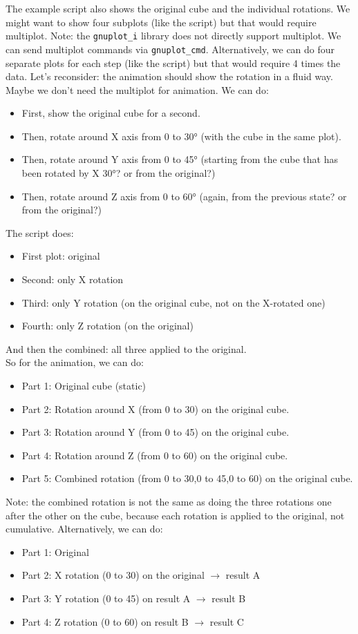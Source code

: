 \documentclass[a4paper,10pt]{article}
\begin{document}
The example script also shows the original cube and the individual rotations.
We might want to show four subplots (like the script) but that would require multiplot.
Note: the \verb|gnuplot_i| library does not directly support multiplot. We can send multiplot commands via \verb|gnuplot_cmd|.
Alternatively, we can do four separate plots for each step (like the script) but that would require 4 times the data.
Let's reconsider: the animation should show the rotation in a fluid way. Maybe we don't need the multiplot for animation.
We can do:
\begin{itemize}
\item First, show the original cube for a second.
\item Then, rotate around X axis from 0 to 30° (with the cube in the same plot).
\item Then, rotate around Y axis from 0 to 45° (starting from the cube that has been rotated by X 30°? or from the original?)
\item Then, rotate around Z axis from 0 to 60° (again, from the previous state? or from the original?)
\end{itemize}
The script does:
\begin{itemize}
\item First plot: original
\item Second: only X rotation
\item Third: only Y rotation (on the original cube, not on the X-rotated one)
\item Fourth: only Z rotation (on the original)
\end{itemize}
And then the combined: all three applied to the original.\\
So for the animation, we can do:
\begin{itemize}
\item Part 1: Original cube (static)
\item Part 2: Rotation around X (from 0 to 30) on the original cube.
\item Part 3: Rotation around Y (from 0 to 45) on the original cube.
\item Part 4: Rotation around Z (from 0 to 60) on the original cube.
\item Part 5: Combined rotation (from 0 to 30,0 to 45,0 to 60) on the original cube.
\end{itemize}
Note: the combined rotation is not the same as doing the three rotations one after the other on the cube, because each rotation is applied to the original, not cumulative.
Alternatively, we can do:
\begin{itemize}
\item Part 1: Original
\item Part 2: X rotation (0 to 30) on the original \(\rightarrow\) result A
\item Part 3: Y rotation (0 to 45) on result A \(\rightarrow\) result B
\item Part 4: Z rotation (0 to 60) on result B \(\rightarrow\) result C
\end{itemize}
\end{document}

